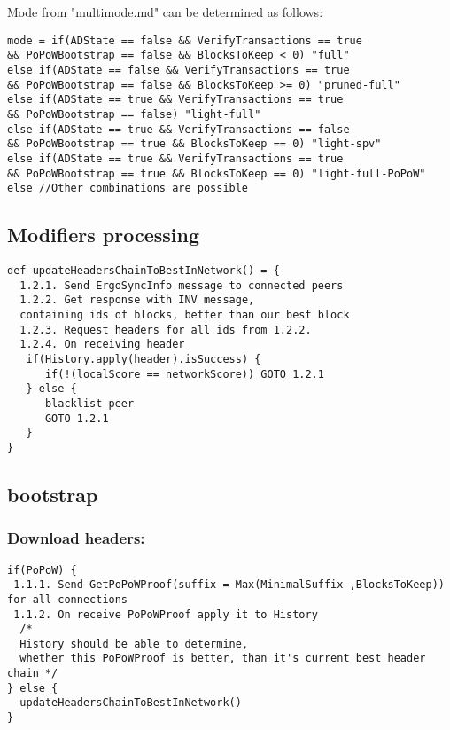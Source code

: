 \documentclass[]{article}   %
\begin{document}
\begin{enumerate}
\begin{itemize}
\end{itemize}
Mode from "multimode.md" can be determined as follows:
\begin{verbatim}
mode = if(ADState == false && VerifyTransactions == true
&& PoPoWBootstrap == false && BlocksToKeep < 0) "full"
else if(ADState == false && VerifyTransactions == true
&& PoPoWBootstrap == false && BlocksToKeep >= 0) "pruned-full"
else if(ADState == true && VerifyTransactions == true
&& PoPoWBootstrap == false) "light-full"
else if(ADState == true && VerifyTransactions == false
&& PoPoWBootstrap == true && BlocksToKeep == 0) "light-spv"
else if(ADState == true && VerifyTransactions == true
&& PoPoWBootstrap == true && BlocksToKeep == 0) "light-full-PoPoW"
else //Other combinations are possible
\end{verbatim}
\end{enumerate}
\subsection{Modifiers processing}
\begin{verbatim}
def updateHeadersChainToBestInNetwork() = {
  1.2.1. Send ErgoSyncInfo message to connected peers
  1.2.2. Get response with INV message,
  containing ids of blocks, better than our best block
  1.2.3. Request headers for all ids from 1.2.2.
  1.2.4. On receiving header
   if(History.apply(header).isSuccess) {
      if(!(localScore == networkScore)) GOTO 1.2.1
   } else {
      blacklist peer
      GOTO 1.2.1
   }
}
\end{verbatim}

\subsection{bootstrap}
\subsubsection{Download headers:}
\begin{verbatim}
if(PoPoW) {
 1.1.1. Send GetPoPoWProof(suffix = Max(MinimalSuffix ,BlocksToKeep)) for all connections
 1.1.2. On receive PoPoWProof apply it to History
  /* 
  History should be able to determine, 
  whether this PoPoWProof is better, than it's current best header chain */
} else {
  updateHeadersChainToBestInNetwork()
}
\end{verbatim}
\end{document}
